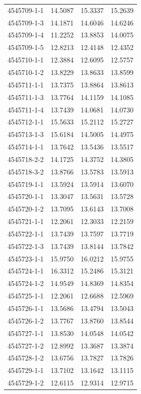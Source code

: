 \begin{longtable}{lrrr}
4545709-1-1 & 14.5087 & 15.3337 & 15.2639 \\
4545709-1-3 & 14.1871 & 14.6046 & 14.6246 \\
4545709-1-4 & 11.2252 & 13.8853 & 14.0075 \\
4545709-1-5 & 12.8213 & 12.4148 & 12.4352 \\
4545710-1-1 & 12.3884 & 12.6095 & 12.5757 \\
4545710-1-2 & 13.8229 & 13.8633 & 13.8599 \\
4545711-1-1 & 13.7375 & 13.8864 & 13.8613 \\
4545711-1-3 & 13.7764 & 14.1159 & 14.1085 \\
4545711-1-4 & 13.7439 & 14.0681 & 14.0730 \\
4545712-1-1 & 15.5633 & 15.2112 & 15.2727 \\
4545713-1-3 & 15.6184 & 14.5005 & 14.4975 \\
4545714-1-1 & 13.7642 & 13.5436 & 13.5517 \\
4545718-2-2 & 14.1725 & 14.3752 & 14.3805 \\
4545718-3-2 & 13.8766 & 13.5783 & 13.5913 \\
4545719-1-1 & 13.5924 & 13.5914 & 13.6070 \\
4545720-1-1 & 13.3047 & 13.5631 & 13.5728 \\
4545720-1-2 & 13.7095 & 13.6143 & 13.7008 \\
4545721-1-1 & 12.2061 & 12.3033 & 12.2159 \\
4545722-1-1 & 13.7439 & 13.7597 & 13.7719 \\
4545722-1-3 & 13.7439 & 13.8144 & 13.7842 \\
4545723-1-1 & 15.9750 & 16.0212 & 15.9755 \\
4545724-1-1 & 16.3312 & 15.2486 & 15.3121 \\
4545724-1-2 & 14.9549 & 14.8369 & 14.8354 \\
4545725-1-1 & 12.2061 & 12.6688 & 12.5969 \\
4545726-1-1 & 13.5686 & 13.4794 & 13.5043 \\
4545726-1-2 & 13.7767 & 13.8760 & 13.8544 \\
4545727-1-1 & 13.8530 & 14.0548 & 14.0542 \\
4545727-1-2 & 12.8992 & 13.3687 & 13.3874 \\
4545728-1-2 & 13.6756 & 13.7827 & 13.7826 \\
4545729-1-1 & 13.7102 & 13.1642 & 13.1115 \\
4545729-1-2 & 12.6115 & 12.9314 & 12.9715 \\

\end{longtable}
